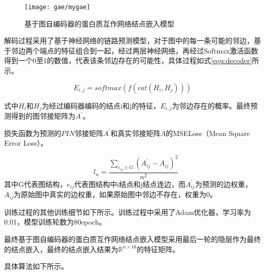 \begin{figure}[htbp]
    \centering
    \texttt{[image: gae/mygae]}
    \caption{基于图自编码器的蛋白质互作网络结点嵌入模型}
    \label{fig:gae/mygae}
\end{figure}

解码过程采用了基于神经网络的链路预测模型，对于图中的每一条可能的邻边，基于邻边两个端点的特征组合到一起，经过两层神经网络，再经过Softmax激活函数得到一个0至1的数值，代表该条邻边存在的可能性，具体过程如式\ref{equ:decoder}所示。

\begin{equation}
    \label{equ:decoder}
    E_{i,j} =softmax(f(cat(H_i,H_j)))
\end{equation}

式中$H_i$和$H_j$为经过编码器编码的结点i和j的特征，$E_{i,j}$为邻边存在的概率。最终预测得到的图邻接矩阵为$A^{\prime}$。


损失函数为预测的$PIN$邻接矩阵$A^{\prime}$和真实邻接矩阵$A$的MSELoss（Mean Square Error Loss）。

\begin{equation}
    \label{equ:autoembedloss}
    \quad l_n =\frac{\sum_{e_{ij}\in G}{  \left( A_{ij}^{\prime} - A_{ij} \right)^2}}{n^2}
\end{equation}
其中G代表图结构，$e_{ij}$代表图结构中i结点和j结点连边，而$A_{ij}^{\prime}$为预测的边权重，$A_{ij}$为原始图中真实的边权重，如果原始图中邻边不存在，权重为0。


训练过程的其他训练细节如下所示。训练过程中采用了Adam优化器，学习率为0.01，模型训练轮数为80epoch。

最终基于图自编码器的蛋白质互作网络结点嵌入模型采用最后一轮的隐层作为最终的结点嵌入，最终的结点嵌入结果为$\mathbb{R}^{n\times 16}$的特征矩阵。

具体算法如下所示。

